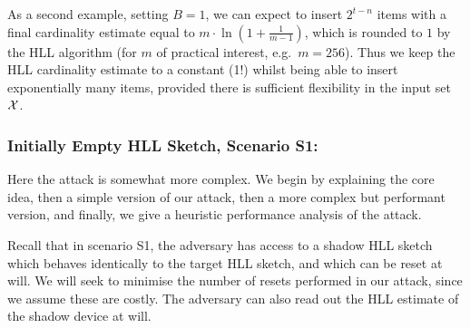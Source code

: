 \documentclass{article}
\begin{document}
As a second example, setting $B = 1$, we can expect to insert $2^{t-n}$ items with a final cardinality estimate equal to $m \cdot \ln (1+\frac{1}{m-1})$, which is rounded to $1$ by the HLL algorithm (for $m$ of practical interest, e.g.\ $m=256$). Thus we keep the HLL cardinality estimate to a constant (1!) whilst being able to insert exponentially many items, provided there is sufficient flexibility in the input set ${\cal X}$.

\subsubsection{Initially Empty HLL Sketch, Scenario S1:} 

Here the attack is somewhat more complex. We begin by explaining the core idea, then a simple version of our attack, then a more complex but performant version, and finally, we give a heuristic performance analysis of the attack.

Recall that in scenario S1, the adversary has access to a shadow HLL sketch which behaves identically to the target HLL sketch, and which can be reset at will. We will seek to minimise the number of resets performed in our attack, since we assume these are costly.  The adversary can also read out the HLL estimate of the shadow device at will. 
\end{document}
